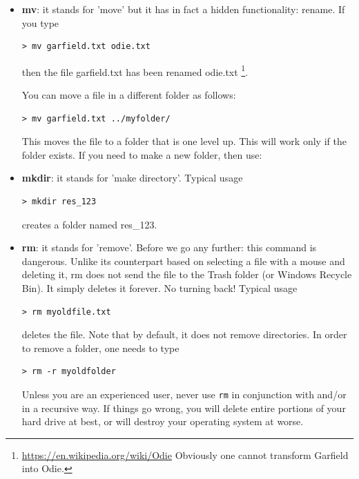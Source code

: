 \begin{itemize}
\item {\color{teal} \bf mv}: it stands for 'move' but it has in fact a hidden functionality: rename.
If you type 
\begin{mdframed}[backgroundcolor=gray!10]
\begin{verbatim}
> mv garfield.txt odie.txt 
\end{verbatim}
\end{mdframed}
then the file {\filenamefont garfield.txt} has been renamed {\filenamefont odie.txt}
\footnote{\url{https://en.wikipedia.org/wiki/Odie} Obviously one cannot transform Garfield into 
Odie.}. 

You can move a file in a different folder as follows:
\begin{mdframed}[backgroundcolor=gray!10]
\begin{verbatim}
> mv garfield.txt ../myfolder/
\end{verbatim}
\end{mdframed}
This moves the file to a folder that is one level up. This will work only if the folder exists.
If you need to make a new folder, then use:
\item {\color{teal} \bf mkdir}: it stands for 'make directory'. Typical usage
\begin{mdframed}[backgroundcolor=gray!10]
\begin{verbatim}
> mkdir res_123 
\end{verbatim}
\end{mdframed}
creates a folder named {\foldernamefont res\_123}. 


\item {\color{teal} \bf rm}: it stands for 'remove'. Before we go any further: this command is dangerous. 
Unlike its counterpart based on selecting a file with a mouse and deleting it, rm does not send 
the file to the Trash folder (or Windows Recycle Bin). It simply deletes it forever. No turning back!
Typical usage
\begin{mdframed}[backgroundcolor=gray!10]
\begin{verbatim}
> rm myoldfile.txt
\end{verbatim}
\end{mdframed}
deletes the file. 
Note that by default, it does not remove directories. In order to remove a folder, one needs to 
type
\begin{mdframed}[backgroundcolor=gray!10]
\begin{verbatim}
> rm -r myoldfolder 
\end{verbatim}
\end{mdframed}
Unless you are an experienced user, never use {\tt rm} in conjunction with {\tt *} and/or in a recursive way.
If things go wrong, you will delete entire portions of your hard drive at best, or will destroy your operating system at worse.  



\end{itemize}
